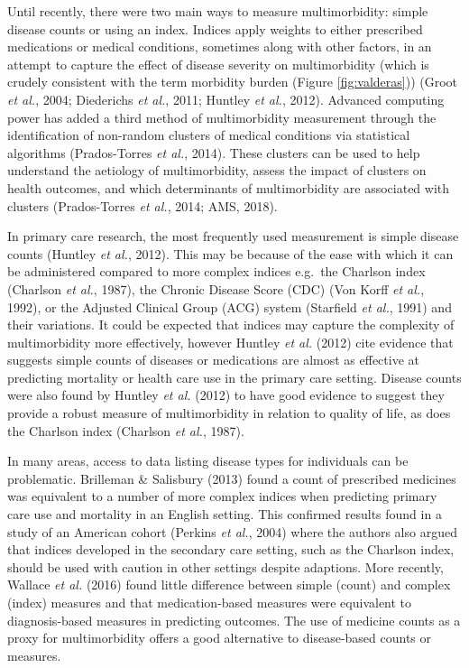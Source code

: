 \documentclass[12pt,a4paper,oneside,table]{report}
\begin{document}
Until recently, there were two main ways to measure multimorbidity:
simple disease counts or using an index. Indices apply weights to either
prescribed medications or medical conditions, sometimes along with other
factors, in an attempt to capture the effect of disease severity on
multimorbidity (which is crudely consistent with the term morbidity
burden (Figure \ref{fig:valderas})) (Groot \emph{et al.}, 2004;
Diederichs \emph{et al.}, 2011; Huntley \emph{et al.}, 2012). Advanced
computing power has added a third method of multimorbidity measurement
through the identification of non-random clusters of medical conditions
via statistical algorithms (Prados-Torres \emph{et al.}, 2014). These
clusters can be used to help understand the aetiology of multimorbidity,
assess the impact of clusters on health outcomes, and which determinants
of multimorbidity are associated with clusters (Prados-Torres \emph{et
al.}, 2014; AMS, 2018).

In primary care research, the most frequently used measurement is simple
disease counts (Huntley \emph{et al.}, 2012). This may be because of the
ease with which it can be administered compared to more complex indices
e.g.~the Charlson index (Charlson \emph{et al.}, 1987), the Chronic
Disease Score (CDC) (Von Korff \emph{et al.}, 1992), or the Adjusted
Clinical Group (ACG) system (Starfield \emph{et al.}, 1991) and their
variations. It could be expected that indices may capture the complexity
of multimorbidity more effectively, however Huntley \textit{et al.}
(2012) cite evidence that suggests simple counts of diseases or
medications are almost as effective at predicting mortality or health
care use in the primary care setting. Disease counts were also found by
Huntley \textit{et al.} (2012) to have good evidence to suggest they
provide a robust measure of multimorbidity in relation to quality of
life, as does the Charlson index (Charlson \emph{et al.}, 1987).

In many areas, access to data listing disease types for individuals can
be problematic. Brilleman \& Salisbury (2013) found a count of
prescribed medicines was equivalent to a number of more complex indices
when predicting primary care use and mortality in an English setting.
This confirmed results found in a study of an American cohort (Perkins
\emph{et al.}, 2004) where the authors also argued that indices
developed in the secondary care setting, such as the Charlson index,
should be used with caution in other settings despite adaptions. More
recently, Wallace \textit{et al.} (2016) found little difference between
simple (count) and complex (index) measures and that medication-based
measures were equivalent to diagnosis-based measures in predicting
outcomes. The use of medicine counts as a proxy for multimorbidity
offers a good alternative to disease-based counts or measures.
\end{document}
